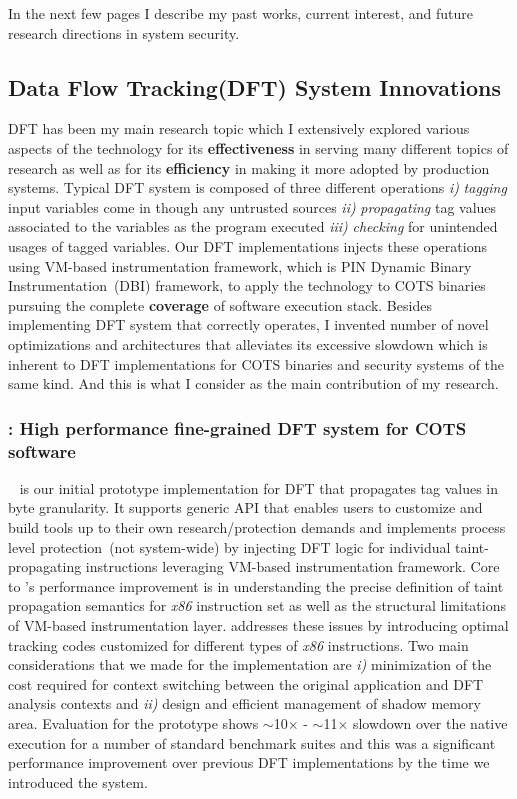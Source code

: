 \documentclass[letterpaper, 10pt]{article}
\begin{document}
\begin{small}
In the next few pages I describe my past works, current interest, and future
research directions in system security.


\subsection*{Data Flow Tracking(DFT) System Innovations}
%
DFT has been my main research topic which I extensively explored various
aspects of the technology for its {\bf effectiveness} in serving many different
topics of research as well as for its {\bf efficiency} in making it more
adopted by production systems.
%
Typical DFT system is composed of three different operations {\it i)} {\it
tagging} input variables come in though any untrusted sources {\it ii)} {\it
propagating} tag values associated to the variables as the program executed
{\it iii)} {\it checking} for unintended usages of tagged variables. Our DFT
implementations injects these operations using VM-based instrumentation
framework, which is PIN Dynamic Binary Instrumentation~(DBI) framework, to
apply the technology to COTS binaries pursuing the complete {\bf coverage} of
software execution stack.
%
Besides implementing DFT system that correctly operates, I invented number of
novel optimizations and architectures that alleviates its excessive slowdown
which is inherent to DFT implementations for COTS binaries and security systems
of the same kind. And this is what I consider as the main contribution of my
research.

\subsubsection*{\libdft: High performance fine-grained DFT system for COTS
software}

\libdft~\cite{libdft:2012vee} is our initial prototype implementation for DFT
that propagates tag values in byte granularity.
%
It supports generic API that enables users to customize and build tools up to
their own research/protection demands and implements process level
protection~(not system-wide) by injecting DFT logic for individual
taint-propagating instructions leveraging VM-based instrumentation framework.
%
Core to \libdft's performance improvement is in understanding the precise
definition of taint propagation semantics for {\it x86} instruction set as well
as the structural limitations of VM-based instrumentation layer. \libdft
addresses these issues by introducing optimal tracking codes customized for
different types of {\it x86} instructions. Two main considerations that we made
for the implementation are {\it i)} minimization of the cost required for
context switching between the original application and DFT analysis contexts
and {\it ii)} design and efficient management of shadow memory area.
%
Evaluation for the prototype shows $\sim$10$\times$ - $\sim$11$\times$ slowdown
over the native execution for a number of standard benchmark suites and this
was a significant performance improvement over previous DFT implementations by
the time we introduced the system.


\end{small}
\end{document}
